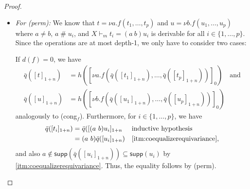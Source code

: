 \documentclass[11pt,a4paper]{amsart}
\newcommand{\Perm}{\mathsf{Perm}(\Names)}
\newcommand{\Term}{\mathsf{Term}}
\newcommand{\sig}{\Sigma}
\newcommand{\Names}{\mathbb{A}}
\newcommand{\fresh}{\mathbin{\#}}
\newcommand{\supp}{\mathsf{supp}}
\theoremstyle{plain}
\numberwithin{equation}{section}
\newcommand{\+}[1]{\mathcal{#1}\xspace}
\theoremstyle{definition}
\begin{document}
\begin{proof}
\begin{enumerate}[wide]
\begin{itemize}
                    If \(r\) and \(s\) are depth-1, then \(l = n\).
                    In this case, let \(\bar{\sigma}: Y \to \Term_{\sig, 0}(M_n X)\) be defined as \(\bar{\sigma}(x) = [\sigma(x)]_n\).
                    It then follows by \cref{thm:coequalizerproperties} \eqref{itm:substitutionlemmadepth1} that
                    \begin{align*}
                        \bar{q}([t]_{1 + n}) &= q([s^n_X((\tau r)\sigma)]_1) = q([(\tau r)\bar{\sigma}]_1) \quad \text{and} \\
                        \bar{q}([u]_{1 + n}) &= q([s^n_X((\tau s)\sigma)]_1) = q([(\tau s)\bar{\sigma}]_1).
                    \end{align*}
                    We can then derive \(Q \vdash_0 (\tau r)\bar{\sigma} = (\tau s)\bar{\sigma}\) by once again showing that \(\bar{\sigma}\) is derivably equivariant:
                    Let \(\pi \in \Perm\) and \(x \in Y\).
                    Then \(\pi\bar{\sigma}(x) = \pi[\sigma(x)]_n = [\pi \sigma(x)]_n = [\sigma(\pi x)]_n\) by assumption.
                \item
                    \textit{For (perm):}
                    We know that \(t = \nu a.f(t_1, \ldots, t_p)\) and \(u = \nu b.f(u_1, \ldots, u_p)\) where \(a \neq b\), \(a \fresh u_i\), and \(X \vdash_m t_i = (a\ b)u_i\) is derivable for all \(i \in \{1, \ldots, p\}\).
                    Since the operations are at most depth-1, we only have to consider two cases:

                    If \(d(f) = 0\), we have
                    \begin{align*}
                        \bar{q}([t]_{1 + n}) &= h([\nu a.f(\bar{q}([t_1]_{1 + n}), \ldots, \bar{q}([t_p]_{1 + n}))]_0) \quad \text{and} \\
                        \bar{q}([u]_{1 + n}) &= h([\nu b.f(\bar{q}([u_1]_{1 + n}), \ldots, \bar{q}([u_p]_{1 + n}))]_0)
                    \end{align*}
                    analogously to (cong$_f$).
                    Furthermore, for \(i \in \{1, \ldots, p\}\), we have
                    \begin{align*}
                        \bar{q}([t_i]_{1 + n})
                        &= \bar{q}([(a\ b)u_i]_{1 + n} && \text{inductive hypothesis} \\
                        &= (a\ b) \bar{q}([u_i]_{1 + n}) && \text{\eqref{itm:coequalizerequivariance}},
                    \end{align*}
                    and also \(a \notin \supp(\bar{q}([u_i]_{1 + n})) \subseteq \supp(u_i)\) by \eqref{itm:coequalizerequivariance}.
                    Thus, the equality follows by (perm).


\end{itemize}
\end{enumerate}
\end{proof}
\end{document}
